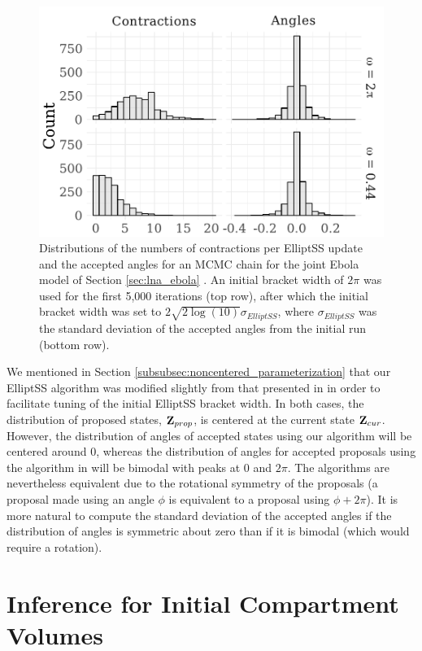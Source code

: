 \begin{figure}[htbp]
	\centering
	\includegraphics[width=0.7\linewidth]{figures/ess_tuning}
	\caption[Distributions of numbers of contractions and accepted for elliptical slice sampling.]{Distributions of the numbers of contractions per ElliptSS update and the accepted angles for an MCMC chain for the joint Ebola model of Section \ref{sec:lna_ebola} . An initial bracket width of $ 2\pi $ was used for the first 5,000 iterations (top row), after which the initial bracket width was set to $ 2\sqrt{2\log(10)}\sigma_{ElliptSS} $, where $ \sigma_{ElliptSS} $ was the standard deviation of the accepted angles from the initial run (bottom row).} 
	\label{fig:esstuning}
\end{figure}

We mentioned in Section \ref{subsubsec:noncentered_parameterization} that our ElliptSS algorithm was modified slightly from that presented in \cite{murray2010} in order to facilitate tuning of the initial ElliptSS bracket width. In both cases, the distribution of proposed states, $ \mathbf{Z}_{prop} $, is centered at the current state $ \mathbf{Z}_{cur} $. However, the distribution of angles of accepted states using our algorithm will be centered around 0, whereas the distribution of angles for accepted proposals using the algorithm in \cite{murray2010} will be bimodal with peaks at 0 and $ 2\pi $. The algorithms are nevertheless equivalent due to the rotational symmetry of the proposals (a proposal made using an angle $ \phi $ is equivalent to a proposal using $ \phi+2\pi $). It is more natural to compute the standard deviation of the accepted angles if the distribution of angles is symmetric about zero than if it is bimodal (which would require a rotation).

\section{Inference for Initial Compartment Volumes}
\label{sec:lna_init_volumes}

